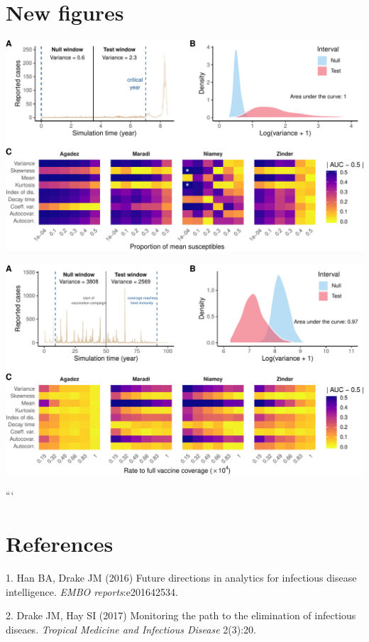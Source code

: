 \documentclass[3p]{elsarticle} %
\makeatletter
\def\maxwidth{\ifdim\Gin@nat@width>\linewidth\linewidth
\else\Gin@nat@width\fi}
\let\Oldincludegraphics\includegraphics
\renewcommand{\includegraphics}[1]{\Oldincludegraphics[width=\maxwidth]{#1}}
\makeatother
\begin{document}
\section{New figures}\label{new-figures}

\includegraphics{measles-ews-manuscript_files/figure-latex/emergence-1.pdf}

\includegraphics{measles-ews-manuscript_files/figure-latex/elimination-1.pdf}

```

\section*{References}\label{references}

\hypertarget{refs}{}
\hypertarget{ref-Han2016}{}
1. Han BA, Drake JM (2016) Future directions in analytics for infectious
disease intelligence. \emph{EMBO reports}:e201642534.

\hypertarget{ref-Drake2017}{}
2. Drake JM, Hay SI (2017) Monitoring the path to the elimination of
infectious diseaes. \emph{Tropical Medicine and Infectious Disease}
2(3):20.
\end{document}
